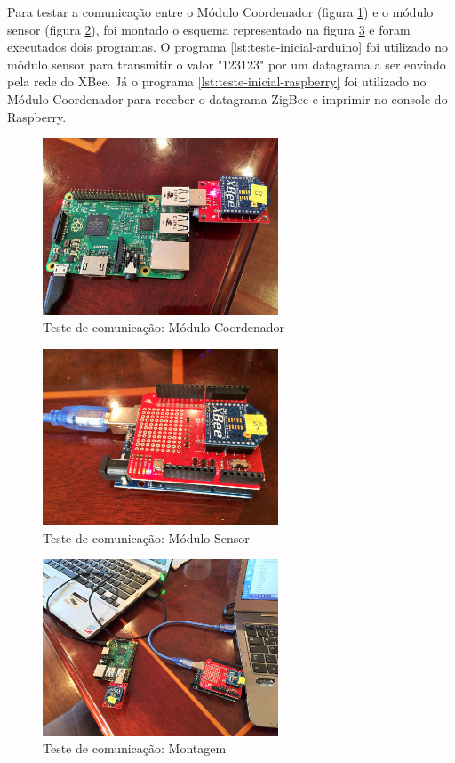 Para testar a comunicação entre o Módulo Coordenador (figura \ref{fig:teste-inicial-raspberry}) e o módulo sensor (figura \ref{fig:teste-inicial-arduino}), foi montado o esquema representado na figura \ref{fig:teste-inicial-all} e foram executados dois programas. O programa \ref{lst:teste-inicial-arduino} foi utilizado no módulo sensor para transmitir o valor "123123" por um datagrama a ser enviado pela rede do XBee. Já o programa \ref{lst:teste-inicial-raspberry} foi utilizado no Módulo Coordenador para receber o datagrama ZigBee e imprimir no console do Raspberry.

\begin{figure}[H]
\centering
\includegraphics[width=7cm,keepaspectratio]{figuras/teste-inicial-raspberry.jpg}
\caption{\label{fig:teste-inicial-raspberry} Teste de comunicação: Módulo Coordenador}
\end{figure}

\begin{figure}[H]
\centering
\includegraphics[width=7cm,keepaspectratio]{figuras/teste-inicial-arduino.jpg} 
\caption{\label{fig:teste-inicial-arduino} Teste de comunicação: Módulo Sensor}
\end{figure}

\begin{figure}[H]
\centering
\includegraphics[width=7cm,keepaspectratio]{figuras/teste-inicial-all.jpg} 
\caption{\label{fig:teste-inicial-all} Teste de comunicação: Montagem}
\end{figure}

